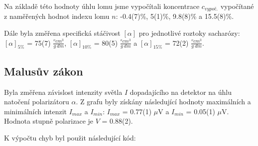 \documentclass[a4paper,11pt]{article}
\begin{document}
    \hspace{10pt}
    \begin{minipage}[t]{0.5\textwidth} 
                Na základě této hodnoty úhlu lomu jsme vypočítali koncentrace $c_{vypoč.}$ vypočítané z naměřených hodnot indexu lomu $n$: -0.4(7)\%, 5(1)\%, 9.8(8)\% a 15.5(8)\%.
                \par Dále byla změřena specifická stáčivost $[\alpha]$ pro jednotlivé roztoky sacharózy: $[\alpha]_{5\%}$ = 75(7) $\frac{^o cm^3}{g ~dm}$, $[\alpha]_{10\%}$ = 80(5) $\frac{^o cm^3}{g ~dm}$ a $[\alpha]_{15\%}$ = 72(2) $\frac{^o cm^3}{g ~dm}$.
            \subsection{Malusův zákon}
                Byla změřena závislost intenzity světla $I$ dopadajícího na detektor na úhlu natočení polarizátoru $\alpha$. Z grafu byly získány následující hodnoty maximálních a minimálních intenzit $I_{max}$ a $I_{min}$: $I_{max}$ = 0.77(1) $\mu$V a $I_{min}$ = 0.05(1) $\mu$V. Hodnota stupně polarizace je $V$ = 0.88(2).
    \end{minipage}
\newpage
    \par K výpočtu chyb byl použit následující kód: 
\end{document}
